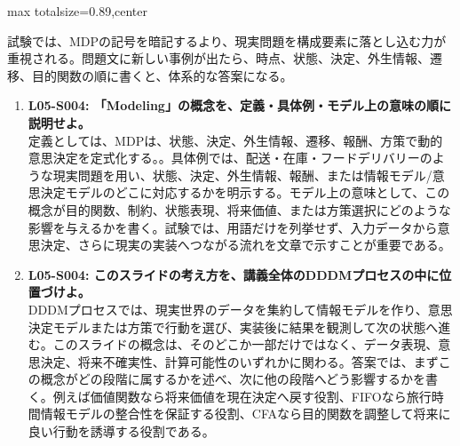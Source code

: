 \begin{minipage}[t]{0.58\textwidth}
\begin{adjustbox}{max totalsize={\textwidth}{0.89\textheight},center}
\begin{minipage}{\textwidth}
試験では、MDPの記号を暗記するより、現実問題を構成要素に落とし込む力が重視される。問題文に新しい事例が出たら、時点、状態、決定、外生情報、遷移、目的関数の順に書くと、体系的な答案になる。\par{}\begin{enumerate}\item \textbf{L05-S004: 「Modeling」の概念を、定義・具体例・モデル上の意味の順に説明せよ。}\\定義としては、MDPは、状態、決定、外生情報、遷移、報酬、方策で動的意思決定を定式化する。。具体例では、配送・在庫・フードデリバリーのような現実問題を用い、状態、決定、外生情報、報酬、または情報モデル/意思決定モデルのどこに対応するかを明示する。モデル上の意味として、この概念が目的関数、制約、状態表現、将来価値、または方策選択にどのような影響を与えるかを書く。試験では、用語だけを列挙せず、入力データから意思決定、さらに現実の実装へつながる流れを文章で示すことが重要である。\item \textbf{L05-S004: このスライドの考え方を、講義全体のDDDMプロセスの中に位置づけよ。}\\DDDMプロセスでは、現実世界のデータを集約して情報モデルを作り、意思決定モデルまたは方策で行動を選び、実装後に結果を観測して次の状態へ進む。このスライドの概念は、そのどこか一部だけではなく、データ表現、意思決定、将来不確実性、計算可能性のいずれかに関わる。答案では、まずこの概念がどの段階に属するかを述べ、次に他の段階へどう影響するかを書く。例えば価値関数なら将来価値を現在決定へ戻す役割、FIFOなら旅行時間情報モデルの整合性を保証する役割、CFAなら目的関数を調整して将来に良い行動を誘導する役割である。\end{enumerate}
\end{minipage}
\end{adjustbox}
\end{minipage}


